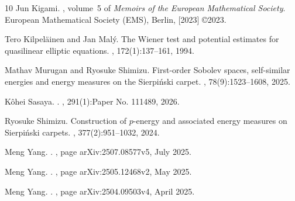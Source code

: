 \documentclass[11pt,a4paper]{article}
\numberwithin{equation}{section}
\theoremstyle{plain}
\theoremstyle{definition}
\begin{document}
\begin{thebibliography}{10}
Jun Kigami.
, volume~5 of {\em Memoirs of the European Mathematical
  Society}.
\newblock European Mathematical Society (EMS), Berlin, [2023] \copyright 2023.

Tero Kilpel\"ainen and Jan Mal\'y.
\newblock The {W}iener test and potential estimates for quasilinear elliptic
  equations.
, 172(1):137--161, 1994.

Mathav Murugan and Ryosuke Shimizu.
\newblock First-order {S}obolev spaces, self-similar energies and energy
  measures on the {S}ierpi\'nski carpet.
, 78(9):1523--1608, 2025.

K{\^o}hei {Sasaya}.
.
, 291(1):Paper No. 111489, 2026.

Ryosuke Shimizu.
\newblock Construction of {$p$}-energy and associated energy measures on
  {S}ierpi\'{n}ski carpets.
, 377(2):951--1032, 2024.

Meng {Yang}.
.
, page arXiv:2507.08577v5, July 2025.

Meng {Yang}.
.
, page arXiv:2505.12468v2, May 2025.

Meng {Yang}.
.
, page arXiv:2504.09503v4, April 2025.

\end{thebibliography}
\end{document}
